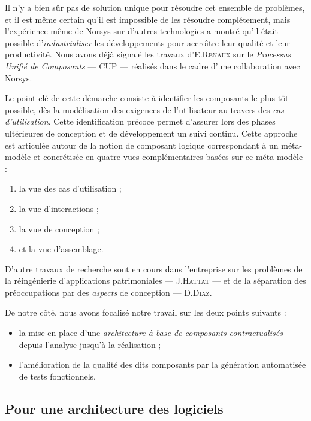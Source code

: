 Il n'y a bien s\^ur pas de solution unique pour r\'esoudre cet
ensemble de probl\`emes, et il est m\^eme certain qu'il est
impossible de les r\'esoudre compl\'etement, mais l'exp\'erience
m\^eme de \textsf{Norsys} sur d'autres technologies a montr\'e qu'il
\'etait possible d'\emph{industrialiser} les d\'eveloppements pour
accro\^{\i}tre leur qualit\'e et leur productivit\'e. Nous avons
d\'ej\`a signal\'e les travaux d'E.\textsc{Renaux} sur le
\emph{Processus Unifi\'e de Composants} --- \textsf{CUP}
---\cite{manu-cup-lmo} r\'ealis\'es dans le cadre d'une collaboration avec
Norsys. 

Le point cl\'e de cette d\'emarche consiste \`a identifier les
composants le plus t\^ot possible, d\`es la mod\'elisation des
exigences de l'utilisateur au travers des \emph{cas
  d'utilisation}. Cette identification pr\'ecoce permet 
 d'assurer lors des phases ult\'erieures de conception et de
d\'eveloppement un suivi continu. Cette approche est
articul\'ee autour de la notion de composant logique correspondant
\`a un m\'eta-mod\`ele et concr\'etis\'ee en quatre vues
compl\'ementaires bas\'ees sur ce m\'eta-mod\`ele :
\begin{enumerate}
  \item la vue des cas d'utilisation ;
  \item la vue d'interactions ;
  \item la vue de conception ;
  \item et la vue d'assemblage. 
\end{enumerate}

D'autre travaux de recherche sont en cours dans l'entreprise
sur les probl\`emes de la r\'eing\'enierie d'applications
patrimoniales --- J.\textsc{Hattat} --- et de la s\'eparation des
pr\'eoccupations par des \emph{aspects} de conception ---
D.\textsc{Diaz}. 

De notre c\^ot\'e, nous avons focalis\'e notre travail sur les deux
points suivants :
\begin{itemize}
  \item la mise en place d'une \emph{architecture \`a base de
    composants contractualis\'es}
    depuis l'analyse jusqu'\`a la r\'ealisation ;
  \item l'am\'elioration de la qualit\'e des dits composants par la
    g\'en\'eration automatis\'ee de tests fonctionnels.
\end{itemize}

\subsection{Pour une architecture des logiciels}


